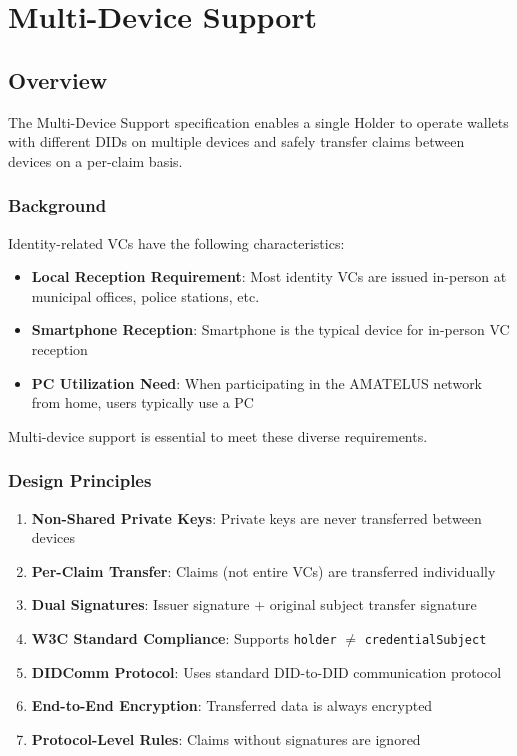 \chapter{Multi-Device Support}

\section{Overview}

The Multi-Device Support specification enables a single Holder to operate wallets with different DIDs on multiple devices and safely transfer claims between devices on a per-claim basis.

\subsection{Background}

Identity-related VCs have the following characteristics:

\begin{itemize}
  \item \textbf{Local Reception Requirement}: Most identity VCs are issued in-person at municipal offices, police stations, etc.
  \item \textbf{Smartphone Reception}: Smartphone is the typical device for in-person VC reception
  \item \textbf{PC Utilization Need}: When participating in the AMATELUS network from home, users typically use a PC
\end{itemize}

Multi-device support is essential to meet these diverse requirements.

\subsection{Design Principles}

\begin{enumerate}
  \item \textbf{Non-Shared Private Keys}: Private keys are never transferred between devices
  \item \textbf{Per-Claim Transfer}: Claims (not entire VCs) are transferred individually
  \item \textbf{Dual Signatures}: Issuer signature + original subject transfer signature
  \item \textbf{W3C Standard Compliance}: Supports \texttt{holder} $\neq$ \texttt{credentialSubject}
  \item \textbf{DIDComm Protocol}: Uses standard DID-to-DID communication protocol
  \item \textbf{End-to-End Encryption}: Transferred data is always encrypted
  \item \textbf{Protocol-Level Rules}: Claims without signatures are ignored
\end{enumerate}

